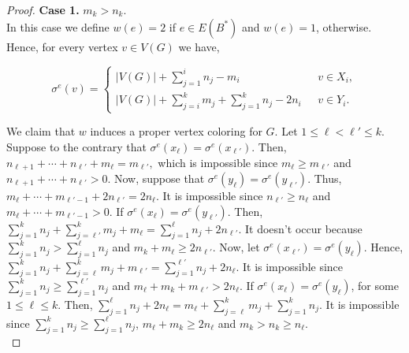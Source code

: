 \documentclass[12pt,a4paper]{article}
\begin{document}
\begin{proof}
	\textbf{Case 1.} $m_k > n_k$.\\
	In this case we define $w(e)=2$ if $e\in E(B^*)$ and $w(e)=1$, otherwise.
	Hence, for every vertex $ v\in V(G) $ we have,
	\begin{center}
		\begin{equation}\label{1}
		\sigma^{e}(v)=
		\left\{
		\begin{array}{ll}
		|V(G)|+\sum _{j=1}^i n_j-m_i & \ \ \ v\in X_i,  \\
		|V(G)|+\sum _{j=i}^k m_j + \sum_{j=1}^k n_j-2n_i & \ \ \ v\in Y_i.
		\end{array}
		\right.
		\end{equation}
	\end{center}
	We claim that $ w $ induces a proper vertex coloring for $ G $. Let $1\leq \ell <\ell'  \leq k $.
	Suppose to the contrary that $\sigma^{e}(x_{\ell})=\sigma^{e}(x_{\ell'})$. Then, $n_{\ell +1}+\cdots +n_{\ell'}+m_{\ell}=m_{\ell'},$
	which is impossible since $m_{\ell}\geq m_{\ell'}$ and $n_{\ell +1}+\cdots +n_{\ell'} >0$. Now, suppose that $\sigma^{e}(y_{\ell})=\sigma^{e}(y_{\ell'})$. Thus,
	$m_{\ell}+\cdots +m_{\ell' -1}+2n_{\ell'}=2n_{\ell}.$
	It is impossible since $n_{\ell'}\geq n_{\ell}$ and $m_{\ell}+\cdots +m_{\ell' -1} >0$.
	If  $\sigma^{e}(x_{\ell})=\sigma^{e}(y_{\ell'})$. Then, $\sum_{j=1}^k n_j+\sum _{j=\ell'}^k m_j+m_{\ell}=\sum _{j=1}^{\ell} n_j +2n_{\ell'}.$
	It doesn't occur because $ \sum_{j=1}^k n_j >\sum _{j=1}^{\ell} n_j$ and  $m_k+m_{\ell} \geq 2n_{\ell'}$.
	Now, let $\sigma^{e}(x_{\ell'})=\sigma^{e}(y_{\ell})$. Hence, $\sum_{j=1}^k n_j+\sum _{j=\ell}^k m_j+m_{\ell'}=\sum _{j=1}^{\ell'} n_j +2n_{\ell}.$
	It is impossible since $ \sum_{j=1}^k n_j \geq \sum _{j=1}^{\ell'} n_j$ and $m_{\ell}+m_k+m_{\ell'} >2n_{\ell}$.
	If  $\sigma^{e}(x_{\ell})=\sigma^{e}(y_{\ell})$, for some  $1\leq \ell \leq k $. Then, $\sum _{j=1}^{\ell} n_j +2n_{\ell}=m_{\ell}+\sum _{j=\ell}^k m_j+\sum_{j=1}^k n_j$. It is impossible since $\sum_{j=1}^k n_j\geq \sum _{j=1}^{\ell} n_j $, $m_{\ell}+m_k \geq 2n_{\ell}$ and $m_k >n_k \geq n_{\ell}$.\\
	

\end{proof}
\end{document}
